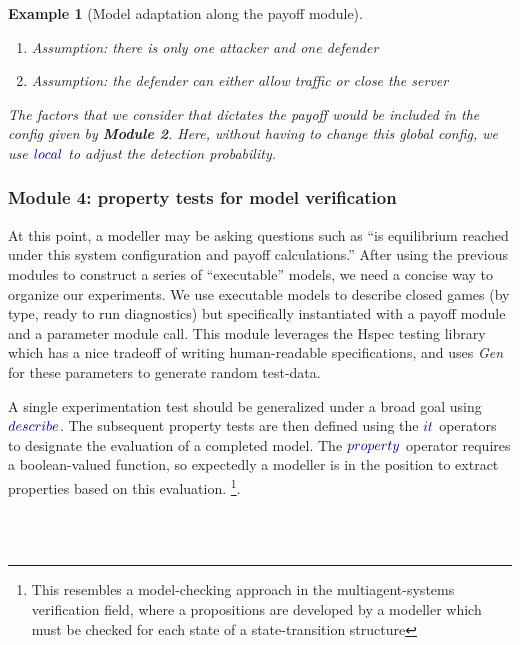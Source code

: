 \documentclass[11pt,titlepage,dvipsnames,table,xcdraw,english]{article}
\newcommand{\Varid}[1]{\mathit{#1}}
\def\resethooks{%
  \global\let\SaveRestoreHook\empty
  \global\let\ColumnHook\empty}
\newcommand{\hsindent}[1]{\quad}%
\let\hspre\empty
\let\hspost\empty
\renewcommand{\Varid}[1]{{\color{typeColor}{#1}}}
\newtheorem{example}{Example}
\begin{document}
\begin{mdframed}
\begin{example}[Model adaptation along the payoff module]
\begin{enumerate}
	\item Assumption: there is only one attacker and one defender
	\item Assumption: the defender can either allow traffic or close the server 
\end{enumerate}

The factors that we consider that dictates the payoff would be included in the config given by \textbf{Module 2}. Here, without having to change this global config, we use \ensuremath{\Varid{local}} to adjust the detection probability. 
   \end{example}
\end{mdframed}

\subsubsection{Module 4: property tests for model verification}
At this point, a modeller may be asking questions such as ``is equilibrium reached under this system configuration and payoff calculations.'' After using the previous modules to construct a series of ``executable'' models, we need a concise way to organize our experiments. We use executable models to describe closed games (by type, ready to run diagnostics) but specifically instantiated with a payoff module and a parameter module call. This module leverages the Hspec testing library which has a nice tradeoff of writing human-readable specifications, and uses \textit{Gen} for these parameters to generate random test-data. 

A single experimentation test should be generalized under a broad goal using \ensuremath{\Varid{describe}}. The subsequent property tests are then defined using the \ensuremath{\Varid{it}} operators to designate the evaluation of a completed model. The \ensuremath{\Varid{property}} operator requires a boolean-valued function, so expectedly a modeller is in the position to extract properties based on this evaluation. \footnote{This resembles a model-checking approach in the multiagent-systems verification field, where a propositions are developed by a modeller which must be checked for each state of a state-transition structure}. 

\begin{minipage}\textwidth
\begin{hscode}\SaveRestoreHook
\column{B}{@{}>{\hspre}l<{\hspost}@{}}%
\column{9}{@{}>{\hspre}l<{\hspost}@{}}%
\column{13}{@{}>{\hspre}l<{\hspost}@{}}%
\column{E}{@{}>{\hspre}l<{\hspost}@{}}%
\>[B]{}\Varid{describe}\;\mid {}\<[E]%
\\
\>[B]{}\hsindent{9}{}\<[9]%
\>[9]{}\Varid{it}\;\mathbin{\$}{}\<[E]%
\\
\>[9]{}\hsindent{4}{}\<[13]%
\>[13]{}\Varid{property}\mathbin{\$}\lambda \Varid{params}\to \Varid{myProposition}{}\<[E]%
\ColumnHook
\end{hscode}\resethooks
\end{minipage}
\end{document}
